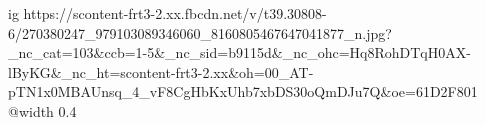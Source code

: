  
 
 
 
 

\ifcmt
  ig https://scontent-frt3-2.xx.fbcdn.net/v/t39.30808-6/270380247_979103089346060_8160805467647041877_n.jpg?_nc_cat=103&ccb=1-5&_nc_sid=b9115d&_nc_ohc=Hq8RohDTqH0AX-lByKG&_nc_ht=scontent-frt3-2.xx&oh=00_AT-pTN1x0MBAUnsq_4_vF8CgHbKxUhb7xbDS30oQmDJu7Q&oe=61D2F801
  @width 0.4
\fi
